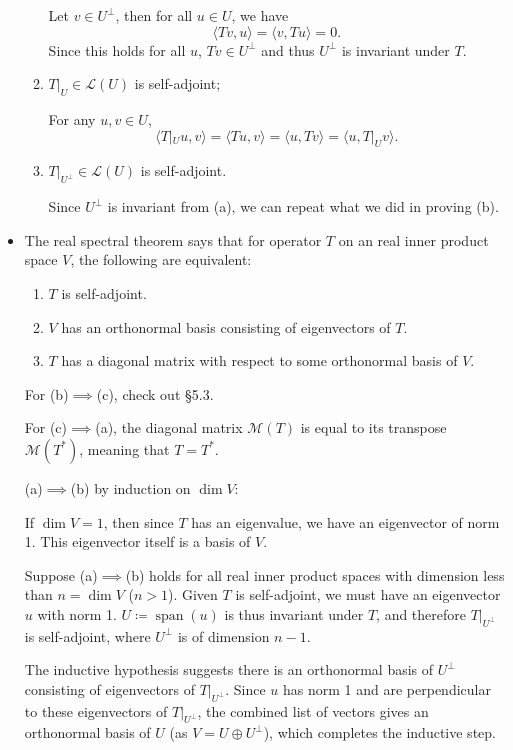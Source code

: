 \documentclass{article}
\newcommand{\s}{\operatorname{span}}
\renewcommand{\d}{\dim}
\newcommand{\inp}[2]{\langle #1, #2 \rangle}
\newcommand{\M}{\mathcal{M}}
\begin{document}
\begin{itemize}
\begin{enumerate}[label=(\alph*)]
        Let $v \in U^\perp$, then for all $u \in U$, we have \[\inp{Tv}{u}=\inp{v}{Tu}=0.\] Since this holds for all $u$, $Tv \in U^\perp$ and thus $U^\perp$ is invariant under $T$.
        \item $T|_U \in \mathcal{L}(U)$ is self-adjoint;
        
        For any $u,v \in U$,
        \[\inp{T|_U u}{v}=\inp{Tu}{v}=\inp{u}{Tv}=\inp{u}{T|_U v}.\]
        \item $T|_{U^\perp} \in \mathcal{L}(U)$ is self-adjoint.
        
        Since $U^\perp$ is invariant from (a), we can repeat what we did in proving (b).
    \end{enumerate}
    
    \item The real spectral theorem says that for operator $T$ on an real inner product space $V$, the following are equivalent:
    \begin{enumerate}[label=(\alph*)]
        \item $T$ is self-adjoint.
        \item $V$ has an orthonormal basis consisting of eigenvectors of $T$.
        \item $T$ has a diagonal matrix with respect to some orthonormal basis of $V$.
    \end{enumerate}
    
    For (b)$\implies$(c), check out \S 5.3.
    
    For (c)$\implies$(a), the diagonal matrix $\M(T)$ is equal to its transpose $\M(T^*)$, meaning that $T = T^*$.
    
    (a)$\implies$(b) by induction on $\d V$:
    
    If $\d V = 1$, then since $T$ has an eigenvalue, we have an eigenvector of norm 1. This eigenvector itself is a basis of $V$.
    
    Suppose (a)$\implies$(b) holds for all real inner product spaces with dimension less than $n = \d V$ ($n > 1$). Given $T$ is self-adjoint, we must have an eigenvector $u$ with norm 1. $U \coloneqq \s(u)$ is thus invariant under $T$, and therefore $T|_{U^\perp}$ is self-adjoint, where $U^\perp$ is of dimension $n-1$.
    
    The inductive hypothesis suggests there is an orthonormal basis of $U^\perp$ consisting of eigenvectors of $T|_{U^\perp}$. Since $u$ has norm 1 and are perpendicular to these eigenvectors of $T|_{U^\perp}$, the combined list of vectors gives an orthonormal basis of $U$ (as $V=U\oplus U^\perp$), which completes the inductive step.
    
\end{itemize}
\end{document}
